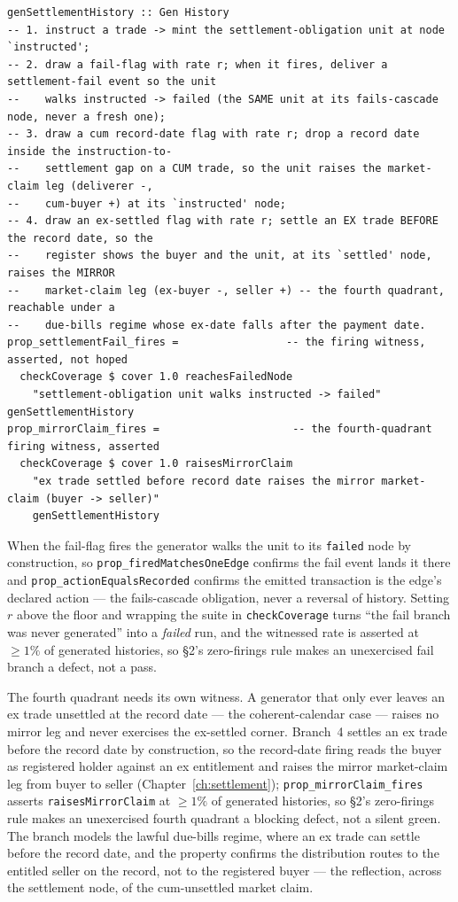 \begin{lstlisting}
genSettlementHistory :: Gen History
-- 1. instruct a trade -> mint the settlement-obligation unit at node `instructed';
-- 2. draw a fail-flag with rate r; when it fires, deliver a settlement-fail event so the unit
--    walks instructed -> failed (the SAME unit at its fails-cascade node, never a fresh one);
-- 3. draw a cum record-date flag with rate r; drop a record date inside the instruction-to-
--    settlement gap on a CUM trade, so the unit raises the market-claim leg (deliverer -,
--    cum-buyer +) at its `instructed' node;
-- 4. draw an ex-settled flag with rate r; settle an EX trade BEFORE the record date, so the
--    register shows the buyer and the unit, at its `settled' node, raises the MIRROR
--    market-claim leg (ex-buyer -, seller +) -- the fourth quadrant, reachable under a
--    due-bills regime whose ex-date falls after the payment date.
prop_settlementFail_fires =                 -- the firing witness, asserted, not hoped
  checkCoverage $ cover 1.0 reachesFailedNode
    "settlement-obligation unit walks instructed -> failed" genSettlementHistory
prop_mirrorClaim_fires =                     -- the fourth-quadrant firing witness, asserted
  checkCoverage $ cover 1.0 raisesMirrorClaim
    "ex trade settled before record date raises the mirror market-claim (buyer -> seller)"
    genSettlementHistory
\end{lstlisting}

When the fail-flag fires the generator walks the unit to its \texttt{failed} node by
construction, so \texttt{prop\_firedMatchesOneEdge} confirms the fail event lands it there
and \texttt{prop\_actionEqualsRecorded} confirms the emitted transaction is the edge's
declared action --- the fails-cascade obligation, never a reversal of history. Setting $r$
above the floor and wrapping the suite in \texttt{checkCoverage} turns ``the fail branch was
never generated'' into a \emph{failed} run, and the witnessed rate is asserted at $\ge 1\%$
of generated histories, so \S 2's zero-firings rule makes an unexercised fail branch a
defect, not a pass.

The fourth quadrant needs its own witness. A generator that only ever leaves an ex trade
unsettled at the record date --- the coherent-calendar case --- raises no mirror leg and
never exercises the ex-settled corner. Branch~4 settles an ex trade before the record date
by construction, so the record-date firing reads the buyer as registered holder against an
ex entitlement and raises the mirror market-claim leg from buyer to seller
(Chapter~\ref{ch:settlement}); \texttt{prop\_mirrorClaim\_fires} asserts
\texttt{raisesMirrorClaim} at $\ge 1\%$ of generated histories, so \S 2's zero-firings rule
makes an unexercised fourth quadrant a blocking defect, not a silent green. The branch
models the lawful due-bills regime, where an ex trade can settle before the record date, and
the property confirms the distribution routes to the entitled seller on the record, not to
the registered buyer --- the reflection, across the settlement node, of the cum-unsettled
market claim.

